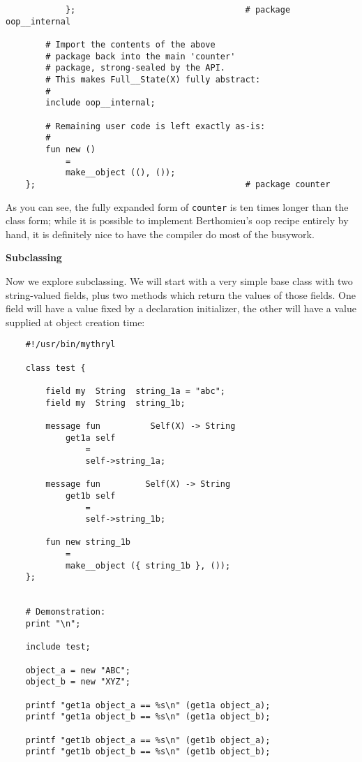 \begin{verbatim}
            };                                  # package oop__internal

        # Import the contents of the above
        # package back into the main 'counter'
        # package, strong-sealed by the API.
        # This makes Full__State(X) fully abstract:
        #
        include oop__internal;

        # Remaining user code is left exactly as-is:
        # 
        fun new ()
            =
            make__object ((), ());
    };                                          # package counter
\end{verbatim}

As you can see, the fully expanded form of {\tt counter} is ten times longer 
than the class form;  while it is possible to implement Berthomieu's oop recipe 
entirely by hand, it is definitely nice to have the compiler do most of the 
busywork.

{\bf Subclassing}

Now we explore subclassing.  We will start with a very simple base 
class with two string-valued fields, plus two methods which return the 
values of those fields.  One field will have a value fixed by a declaration 
initializer, the other will have a value supplied at object creation time:

\begin{verbatim}
    #!/usr/bin/mythryl

    class test {

        field my  String  string_1a = "abc";
        field my  String  string_1b;

        message fun          Self(X) -> String
            get1a self
                =
                self->string_1a;

        message fun         Self(X) -> String
            get1b self
                =
                self->string_1b;

        fun new string_1b
            =
            make__object ({ string_1b }, ());
    };


    # Demonstration:
    print "\n";

    include test;

    object_a = new "ABC";
    object_b = new "XYZ";

    printf "get1a object_a == %s\n" (get1a object_a);
    printf "get1a object_b == %s\n" (get1a object_b);

    printf "get1b object_a == %s\n" (get1b object_a);
    printf "get1b object_b == %s\n" (get1b object_b);
\end{verbatim}

